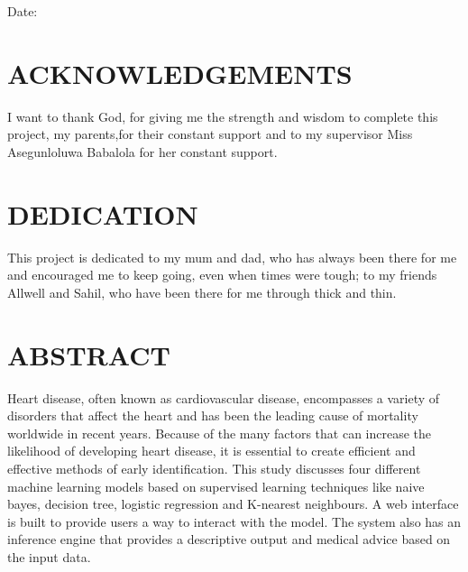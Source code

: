 \documentclass[12pt,paper=a4,oneside,cleardoubleage=plain,final]{report}
\begin{document}
\vfill


\begin{flushleft}
Date:
\end{flushleft}

\chapter*{ACKNOWLEDGEMENTS}
\noindent
I want to thank God, for giving me the strength and wisdom to complete this project, my parents,for their constant support and to my supervisor Miss Asegunloluwa Babalola for her constant support.

\chapter*{DEDICATION}
\noindent
This project is dedicated to my mum and dad, who has always been there for me and encouraged me to keep going, even when times were tough; to my friends Allwell and Sahil, who have been there for me through thick and thin.


\chapter*{ABSTRACT}
\noindent
Heart disease, often known as cardiovascular disease, encompasses a variety of disorders that affect the heart and has been the leading cause of mortality worldwide in recent years. Because of the many factors that can increase the likelihood of developing heart disease, it is essential to create efficient and effective methods of early identification. This study discusses four different machine learning models based on supervised learning techniques like naive bayes, decision tree, logistic regression and K-nearest neighbours. A web interface is built to provide users a way to interact with the model. The system also has an inference engine that provides a descriptive output and medical advice based on the input data.


{
	\onehalfspacing
	\renewcommand{\contentsname}{Table of Contents}
	\tableofcontents
	\listoffigures
}



\end{document}
